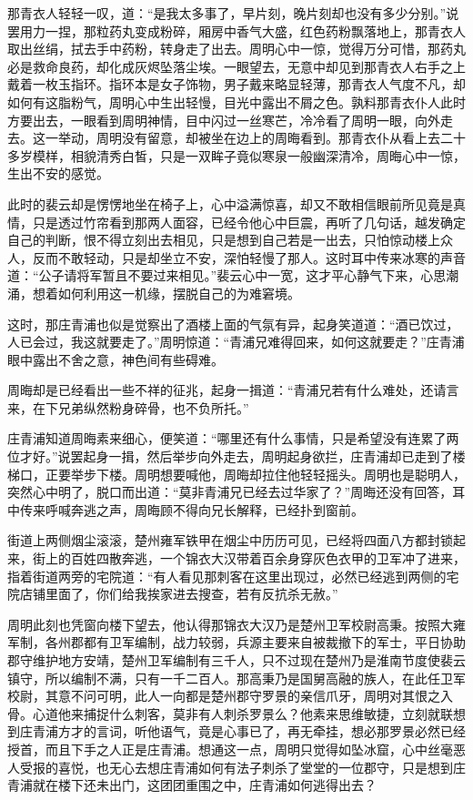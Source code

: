 那青衣人轻轻一叹，道：“是我太多事了，早片刻，晚片刻却也没有多少分别。”说罢用力一捏，那粒药丸变成粉碎，厢房中香气大盛，红色药粉飘落地上，那青衣人取出丝绢，拭去手中药粉，转身走了出去。周明心中一惊，觉得万分可惜，那药丸必是救命良药，却化成灰烬坠落尘埃。一眼望去，无意中却见到那青衣人右手之上戴着一枚玉指环。指环本是女子饰物，男子戴来略显轻薄，那青衣人气度不凡，却如何有这脂粉气，周明心中生出轻慢，目光中露出不屑之色。孰料那青衣仆人此时方要出去，一眼看到周明神情，目中闪过一丝寒芒，冷冷看了周明一眼，向外走去。这一举动，周明没有留意，却被坐在边上的周晦看到。那青衣仆从看上去二十多岁模样，相貌清秀白皙，只是一双眸子竟似寒泉一般幽深清冷，周晦心中一惊，生出不安的感觉。

此时的裴云却是愣愣地坐在椅子上，心中溢满惊喜，却又不敢相信眼前所见竟是真情，只是透过竹帘看到那两人面容，已经令他心中巨震，再听了几句话，越发确定自己的判断，恨不得立刻出去相见，只是想到自己若是一出去，只怕惊动楼上众人，反而不敢轻动，只是却坐立不安，深怕轻慢了那人。这时耳中传来冰寒的声音道：“公子请将军暂且不要过来相见。”裴云心中一宽，这才平心静气下来，心思潮涌，想着如何利用这一机缘，摆脱自己的为难窘境。

这时，那庄青浦也似是觉察出了酒楼上面的气氛有异，起身笑道道：“酒已饮过，人已会过，我这就要走了。”周明惊道：“青浦兄难得回来，如何这就要走？”庄青浦眼中露出不舍之意，神色间有些碍难。

周晦却是已经看出一些不祥的征兆，起身一揖道：“青浦兄若有什么难处，还请言来，在下兄弟纵然粉身碎骨，也不负所托。”

庄青浦知道周晦素来细心，便笑道：“哪里还有什么事情，只是希望没有连累了两位才好。”说罢起身一揖，然后举步向外走去，周明起身欲拦，庄青浦却已走到了楼梯口，正要举步下楼。周明想要喊他，周晦却拉住他轻轻摇头。周明也是聪明人，突然心中明了，脱口而出道：“莫非青浦兄已经去过华家了？”周晦还没有回答，耳中传来呼喊奔逃之声，周晦顾不得向兄长解释，已经扑到窗前。

街道上两侧烟尘滚滚，楚州雍军铁甲在烟尘中历历可见，已经将四面八方都封锁起来，街上的百姓四散奔逃，一个锦衣大汉带着百余身穿灰色衣甲的卫军冲了进来，指着街道两旁的宅院道：“有人看见那刺客在这里出现过，必然已经逃到两侧的宅院店铺里面了，你们给我挨家进去搜查，若有反抗杀无赦。”

周明此刻也凭窗向楼下望去，他认得那锦衣大汉乃是楚州卫军校尉高秉。按照大雍军制，各州郡都有卫军编制，战力较弱，兵源主要来自被裁撤下的军士，平日协助郡守维护地方安靖，楚州卫军编制有三千人，只不过现在楚州乃是淮南节度使裴云镇守，所以编制不满，只有一千二百人。那高秉乃是国舅高融的族人，在此任卫军校尉，其意不问可明，此人一向都是楚州郡守罗景的亲信爪牙，周明对其恨之入骨。心道他来捕捉什么刺客，莫非有人刺杀罗景么？他素来思维敏捷，立刻就联想到庄青浦方才的言词，听他语气，竟是心事已了，再无牵挂，想必那罗景必然已经授首，而且下手之人正是庄青浦。想通这一点，周明只觉得如坠冰窟，心中丝毫恶人受报的喜悦，也无心去想庄青浦如何有法子刺杀了堂堂的一位郡守，只是想到庄青浦就在楼下还未出门，这团团重围之中，庄青浦如何逃得出去？

